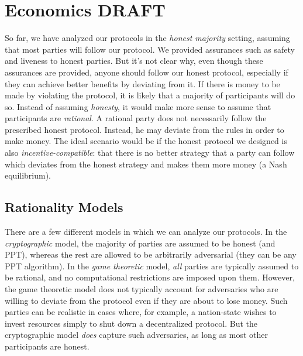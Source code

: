 \chapter{Economics \small{\textsf{DRAFT}}}\label{chapter:economics}

So far, we have analyzed our protocols in the \emph{honest majority} setting,
assuming that most parties will follow our protocol. We provided assurances
such as safety and liveness to honest parties. But it's not clear why,
even though these assurances are provided, anyone should follow our honest
protocol, especially if they can achieve better benefits by deviating from
it. If there is money to be made by violating the protocol, it is likely that
a majority of participants will do so. Instead of assuming \emph{honesty},
it would make more sense to assume that participants are \emph{rational}.
A rational party does not necessarily follow the prescribed honest protocol.
Instead, he may deviate from the rules in order to make money.
The ideal scenario would be if the honest protocol we designed is also
\emph{incentive-compatible}:
that there is no better strategy that
a party can follow which deviates from the honest strategy and makes them
more money (a Nash equilibrium).

\section{Rationality Models}

There are a few different models in which we can analyze our protocols.
In the \emph{cryptographic} model, the majority of parties are assumed
to be honest (and PPT), whereas the rest are allowed to be arbitrarily
adversarial (they can be any PPT algorithm). In the \emph{game theoretic}
model, \emph{all} parties are typically assumed to be rational, and
no computational restrictions are imposed upon them. However, the game
theoretic model does not typically account for adversaries who are willing
to deviate from the protocol even if they are about to lose money. Such
parties can be realistic in cases where, for example, a nation-state
wishes to invest resources simply to shut down a decentralized protocol.
But the cryptographic model \emph{does} capture such adversaries, as
long as most other participants are honest.

